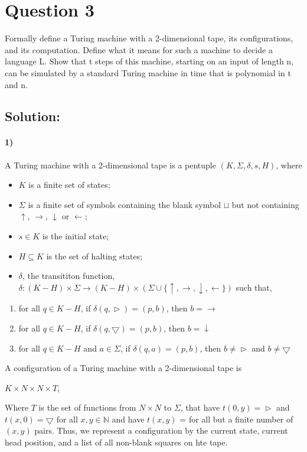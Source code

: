 \documentclass[12pt]{article}
\begin{document}
\section*{Question 3}
Formally define a Turing machine with a 2-dimensional tape, its configurations, and its computation.
Define what it means for such a machine to decide a language L. Show that t steps of this machine,
starting on an input of length n, can be simulated by a standard Turing machine in time that is
polynomial in t and n.
\subsection*{Solution:}
\paragraph{1)} A Turing machine with a 2-dimensional tape is a pentuple $(K, \Sigma, \delta, s, H)$, where

\begin{itemize}
    \item $K$ is a finite set of states;
    \item $\Sigma$ is a finite set of symbols containing the blank symbol $\sqcup$ but not containing $\uparrow$, $\rightarrow$, $\downarrow$ or $\leftarrow$;
    \item $s\in K$ is the initial state;
    \item $H \subseteq K$ is the set of halting states;
    \item $\delta$, the transititon function, $\delta: (K - H) \times  \Sigma \to (K - H) \times (\Sigma \cup \{\uparrow, \rightarrow, \downarrow, \leftarrow\})$ such that,
\end{itemize}
\begin{enumerate}[label=(\alph*)]
    \item for all $q \in K-H$, if $\delta(q, \vartriangleright) = (p, b)$, then $b = \rightarrow$
    \item for all $q \in K-H$, if $\delta(q, \bigtriangledown) = (p, b)$, then $b = \downarrow$
    \item for all $q \in K-H$ and $a \in \Sigma$, if $\delta(q, a) = (p, b)$, then $b \neq \vartriangleright$ and $b \neq \bigtriangledown$
\end{enumerate}

A configuration of a Turing machine with a 2-dimensional tape is
\begin{center}
    $K \times N \times N \times T$,
\end{center}
Where $T$ is the set of functions from $N \times N$ to $\Sigma$, that have $t(0, y) = \vartriangleright$ and $t(x, 0) = \bigtriangledown$ for all $x, y \in \mathbb{N}$ and have $t(x, y)$ = for all but a finite number of $(x, y)$ pairs. Thus, we represent a configuration by the current state, current head position, and a list of all non-blank squares on hte tape.
\end{document}
